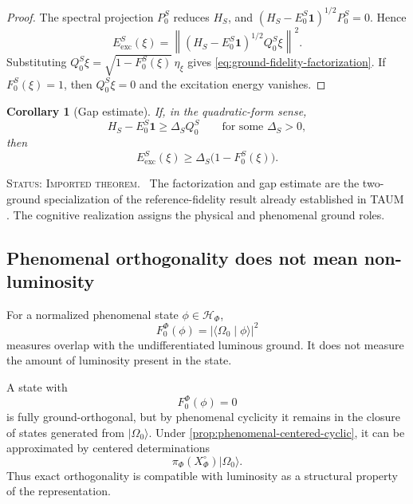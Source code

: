 \documentclass[11pt,reqno]{scrartcl}
\newcommand{\scrHF}{\mathscr H_{\Phi}}
\newcommand{\piF}{\pi_{\Phi}}
\newcommand{\idop}{\mathbf 1}
\newcommand{\ket}[1]{\lvert #1\rangle}
\newcommand{\braket}[2]{\langle #1\mid #2\rangle}
\newcommand{\statuslabel}[1]{\par\smallskip\noindent\textsc{Status: #1.}\ }
\theoremstyle{plain}
\newtheorem{corollary}[corollary]{Corollary}
\theoremstyle{definition}
\theoremstyle{remark}
\begin{document}
\begin{proof}
The spectral projection $P_0^S$ reduces $H_S$, and
$(H_S-E_0^S\idop)^{1/2}P_0^S=0$.  Hence
\begin{equation}
  E_{\mathrm{exc}}^S(\xi)
  =\left\|
  (H_S-E_0^S\idop)^{1/2}Q_0^S\xi
  \right\|^2.
\end{equation}
Substituting
$Q_0^S\xi=\sqrt{1-F_0^S(\xi)}\,\eta_{\xi}$ gives
\eqref{eq:ground-fidelity-factorization}.  If $F_0^S(\xi)=1$, then
$Q_0^S\xi=0$ and the excitation energy vanishes.
\end{proof}

\begin{corollary}[Gap estimate]
\label{cor:ground-gap-fidelity}
If, in the quadratic-form sense,
\begin{equation}
  H_S-E_0^S\idop
  \geq
  \Delta_S Q_0^S
  \qquad
  \text{for some }\Delta_S>0,
  \label{eq:ground-gap-form}
\end{equation}
then
\begin{equation}
  E_{\mathrm{exc}}^S(\xi)
  \geq
  \Delta_S\bigl(1-F_0^S(\xi)\bigr).
  \label{eq:ground-gap-bound}
\end{equation}
\end{corollary}

\statuslabel{Imported theorem} The factorization and gap estimate are the
two-ground specialization of the reference-fidelity result already established
in TAUM \cite{TAUM2026}.  The cognitive realization assigns the physical and
phenomenal ground roles.

\subsection{Phenomenal orthogonality does not mean non-luminosity}

For a normalized phenomenal state $\phi\in\scrHF$,
\begin{equation}
  F_0^{\Phi}(\phi)
  =|\braket{\Omega_0}{\phi}|^2
  \label{eq:phenomenal-ground-fidelity}
\end{equation}
measures overlap with the undifferentiated luminous ground.  It does not
measure the amount of luminosity present in the state.

A state with
\begin{equation}
  F_0^{\Phi}(\phi)=0
\end{equation}
is fully ground-orthogonal, but by phenomenal cyclicity it remains in the
closure of states generated from $\ket{\Omega_0}$.  Under
\cref{prop:phenomenal-centered-cyclic}, it can be approximated by centered
determinations
\begin{equation}
  \piF(X^{\circ}_{\Phi})\ket{\Omega_0}.
\end{equation}
Thus exact orthogonality is compatible with luminosity as a structural
property of the representation.
\end{document}
